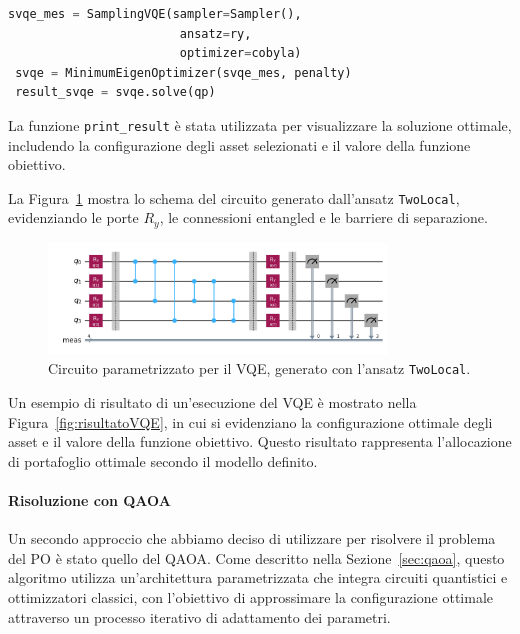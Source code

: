 \begin{lstlisting}[language=python, caption={\mmerenda{todo}}]
 svqe_mes = SamplingVQE(sampler=Sampler(), 
                        ansatz=ry, 
                        optimizer=cobyla)
 svqe = MinimumEigenOptimizer(svqe_mes, penalty)
 result_svqe = svqe.solve(qp)
\end{lstlisting}

La funzione \texttt{print\_result} è stata utilizzata per visualizzare la soluzione 
ottimale, includendo la configurazione degli asset selezionati e il valore della 
funzione obiettivo.

La Figura~\ref{fig:vqe_circuit} mostra lo schema del circuito generato dall'ansatz 
\texttt{TwoLocal}, evidenziando le porte $R_y$, le connessioni entangled e le 
barriere di separazione.

\begin{figure}[h!]
    \centering
    \includegraphics[width=0.8\textwidth]{images/circuitoVQE.png}
    \caption{Circuito parametrizzato per il VQE, generato con l'ansatz \texttt{TwoLocal}.}
    \label{fig:vqe_circuit}
\end{figure}

Un esempio di risultato di un'esecuzione del VQE è mostrato nella Figura~\ref{fig:risultatoVQE}, 
in cui si evidenziano la configurazione ottimale degli asset e il valore della 
funzione obiettivo. Questo risultato rappresenta l'allocazione di portafoglio 
ottimale secondo il modello definito.



\paragraph{Risoluzione con QAOA}
Un secondo approccio che abbiamo deciso di utilizzare per risolvere il problema del PO 
è stato quello del QAOA. Come descritto nella Sezione~\ref{sec:qaoa}, questo algoritmo 
utilizza un'architettura parametrizzata che integra circuiti quantistici e ottimizzatori 
classici, con l'obiettivo di approssimare la configurazione ottimale attraverso un 
processo iterativo di adattamento dei parametri.

